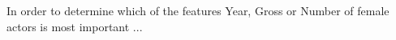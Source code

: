 \documentclass[../../project.tex]{subfiles}
\begin{document}
	In order to determine which of the features Year, Gross or Number of female actors is most important ...
\end{document}
